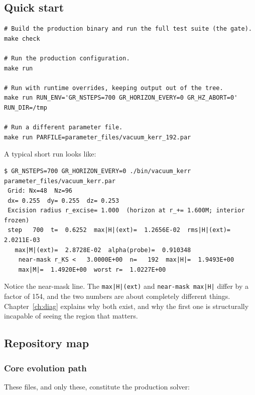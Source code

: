 \subsection{Quick start}

\begin{lstlisting}
# Build the production binary and run the full test suite (the gate).
make check

# Run the production configuration.
make run

# Run with runtime overrides, keeping output out of the tree.
make run RUN_ENV='GR_NSTEPS=700 GR_HORIZON_EVERY=0 GR_HZ_ABORT=0' RUN_DIR=/tmp

# Run a different parameter file.
make run PARFILE=parameter_files/vacuum_kerr_192.par
\end{lstlisting}

A typical short run looks like:

\begin{lstlisting}
$ GR_NSTEPS=700 GR_HORIZON_EVERY=0 ./bin/vacuum_kerr parameter_files/vacuum_kerr.par
 Grid: Nx=48  Nz=96
 dx= 0.255  dy= 0.255  dz= 0.253
 Excision radius r_excise= 1.000  (horizon at r_+= 1.600M; interior frozen)
 step   700  t=  0.6252  max|H|(ext)=  1.2656E-02  rms|H|(ext)=  2.0211E-03
   max|M|(ext)=  2.8728E-02  alpha(probe)=  0.910348
    near-mask r_KS <   3.0000E+00  n=   192  max|H|=  1.9493E+00
    max|M|=  1.4920E+00  worst r=  1.0227E+00
\end{lstlisting}

Notice the near-mask line. The \texttt{max|H|(ext)} and \texttt{near-mask
max|H|} differ by a factor of 154, and the two numbers are about completely
different things. Chapter~\ref{ch:diag} explains why both exist, and why the
first one is structurally incapable of seeing the region that matters.

\subsection{Repository map}

\subsubsection{Core evolution path}

These files, and only these, constitute the production solver:

